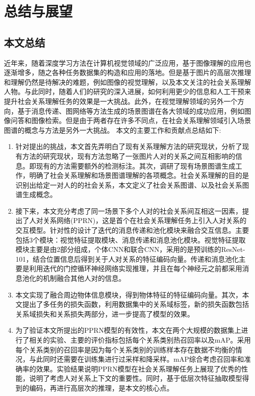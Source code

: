
\chapter{总结与展望}
\label{ch:conclusion}

\section{本文总结}

近年来，随着深度学习方法在计算机视觉领域的广泛应用，基于图像理解的应用也逐渐增多，随之各种任务数据集的构造和应用的落地。但是基于图片的高层次推理和理解仍然是待解决的难题，例如图像的视觉理解，以及本文关注的社会关系理解人物。与此同时，随着人们的研究的深入进展，如何利用更少的信息和人工干预来提升社会关系理解任务的效果是一大挑战。此外，在视觉理解领域的另外一个方向，基于消息传递、图网络等方法生成的场景图谱在各大领域的成功应用，例如图像问答和图像检索。但是由于两者存在许多不同点，在社会关系理解领域引入场景图谱的概念与方法是另外一大挑战。
本文的主要工作和贡献点总结如下:
\begin{enumerate}
    \item 针对提出的挑战，本文首先弄明白了现有关系理解方法的研究现状，分析了现有方法的研究现状，现有方法忽略了一张图片人对的关系之间互相影响的信息。即现有的方法需要额外的检测标注。其次，调研了现有场景图谱生成工作，明确了社会关系理解和场景图谱理解的各项概念。社会关系理解的目的是识别出给定一对人的的社会关系，本文定义了社会关系图谱、以及社会关系图谱生成概念。
    \item 接下来，本文充分考虑了同一场景下多个人对的社会关系间互相这一因素，提出了人对关系网络(PPRN)，这是首个在社会关系理解任务上引入人对关系的交互模型。针对性的设计了迭代的消息传递和池化模块来融合交互信息。主要包括3个模块：视觉特征提取模块、消息传递和消息池化模块。视觉特征提取模块主要是由2部分组成，个体CNN和联合CNN，采用的是预训练的ResNet-101，结合位置信息后得到关于人对关系的特征编码向量。传递和消息池化主要是利用迭代的门控循环神经网络实现推理，并且在每个神经元之前都采用消息池化的机制融合其他人对的信息。
    \item 本文实现了融合周边物体信息模块，得到物体特征的特征编码向量。其次，本文提出了多任务的损失函数，利用数据集中的关系域标签，新的损失函数包括关系域损失和关系损失两部分，进一步提高了模型的效果。
    \item 为了验证本文所提出的PPRN模型的有效性，本文在两个大规模的数据集上进行了相关的实验、主要的评价指标包括每个关系类别热召回率以及mAP。采用每个关系类别的召回率是因为每个关系类别的训练样本存在数据不均衡的情况，与此同时还需要在训练集进行过采样和降采样。mAP综合考虑召回率和准确率的效果。实验结果说明PPRN模型在社会关系理解任务上展现了优秀的性能，说明了考虑人对关系上下文的重要性。同时，基于低层次特征抽取模型得到的编码，再进行高层次的推理，是本文的核心点。
\end{enumerate}

